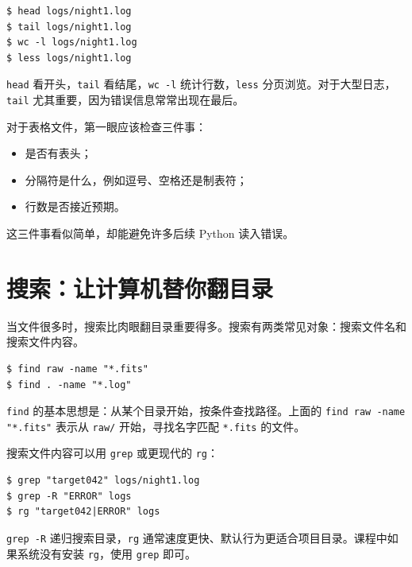 \begin{examplebox}[文本文件快速预览]
\begin{lstlisting}[style=terminal]
$ head logs/night1.log
$ tail logs/night1.log
$ wc -l logs/night1.log
$ less logs/night1.log
\end{lstlisting}
\end{examplebox}

\texttt{head} 看开头，\texttt{tail} 看结尾，\texttt{wc -l} 统计行数，\texttt{less} 分页浏览。对于大型日志，\texttt{tail} 尤其重要，因为错误信息常常出现在最后。

对于表格文件，第一眼应该检查三件事：

\begin{itemize}
    \item 是否有表头；
    \item 分隔符是什么，例如逗号、空格还是制表符；
    \item 行数是否接近预期。
\end{itemize}

这三件事看似简单，却能避免许多后续 Python 读入错误。

\section{搜索：让计算机替你翻目录}

当文件很多时，搜索比肉眼翻目录重要得多。搜索有两类常见对象：搜索文件名和搜索文件内容。

\begin{examplebox}[按文件名搜索]
\begin{lstlisting}[style=terminal]
$ find raw -name "*.fits"
$ find . -name "*.log"
\end{lstlisting}
\end{examplebox}

\texttt{find} 的基本思想是：从某个目录开始，按条件查找路径。上面的 \texttt{find raw -name "*.fits"} 表示从 \texttt{raw/} 开始，寻找名字匹配 \texttt{*.fits} 的文件。

搜索文件内容可以用 \texttt{grep} 或更现代的 \texttt{rg}：

\begin{examplebox}[按内容搜索]
\begin{lstlisting}[style=terminal]
$ grep "target042" logs/night1.log
$ grep -R "ERROR" logs
$ rg "target042|ERROR" logs
\end{lstlisting}
\end{examplebox}

\texttt{grep -R} 递归搜索目录，\texttt{rg} 通常速度更快、默认行为更适合项目目录。课程中如果系统没有安装 \texttt{rg}，使用 \texttt{grep} 即可。

